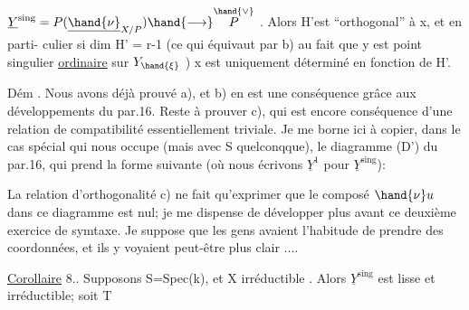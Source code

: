 
$\underline{Y}^{\mathrm{sing}} = P(\underline{\hand{\nu}}_{X/P}) \hand{\longrightarrow} \overset{\hand{\vee}}{P}$ . Alors H'est ``orthogonal'' à x, et en parti-%
culier si dim H' = r-1 (ce qui équivaut par b) au fait que 
y est point  singulier \uline{ordinaire} sur $Y_{\hand{\xi}}$ ) x est uniquement déterminé
en fonction de H'.

Dém . Nous avons déjà prouvé a), et b) en est une conséquence
grâce aux développements du par.16. Reste à prouver c), qui est
encore conséquence d'une relation de compatibilité essentiellement
triviale. Je me borne ici à copier, dans le cas spécial qui nous
occupe (mais avec S quelconqque), le diagramme (D') du par.16, qui
prend la forme suivante (où nous écrivons $\underline{Y}^1$ pour $\underline{Y}^{\mathrm{sing}}$):


La relation d'orthogonalité c) ne fait qu'exprimer que le composé
$\hand{\nu}u$ dans ce diagramme est nul; je me dispense de développer plus
avant ce deuxième exercice de symtaxe. Je suppose que les gens avaient
l'habitude de prendre des coordonnées, et ils y voyaient peut-être plus
clair ....

\uline{Corollaire} 8.. Supposons S=Spec(k),   et X
irréductible .  Alors $\underline{Y}^{\mathrm{sing}}$ est lisse et irréductible; soit T

